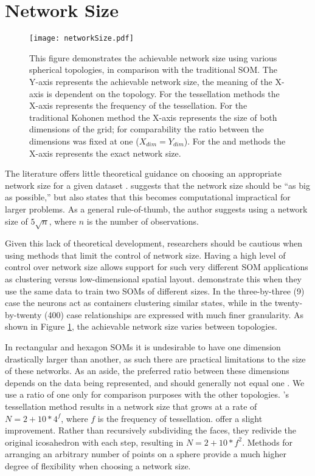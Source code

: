 \section{Network Size}
\begin{figure}[htb]
\centering
\texttt{[image: networkSize.pdf]}
\caption{This figure demonstrates the achievable network size using various
spherical topologies, in comparison with the traditional SOM. The Y-axis represents the achievable network size, the
meaning of the X-axis is dependent on the topology. For the tessellation
methods the X-axis represents the frequency of the tessellation. For the
traditional Kohonen method the X-axis represents the size of both dimensions of
the grid; for comparability the ratio between the dimensions was fixed at one
($X_{dim}=Y_{dim}$).  For the \cite{Rakhmanov94} and \cite{Nishio:2006fk} methods the X-axis
represents the exact network size.}
\label{fig:nSize}
\end{figure}
The literature offers little theoretical guidance on choosing an appropriate
network size for a given dataset \citep{cho1996}.  \cite{toolbox} suggests
that the network size should be ``as big as possible,'' but also states that
this becomes computational impractical for larger problems. As a general
rule-of-thumb, the author suggests using a network size of \(5\sqrt {n}\),
where \(n\) is the number of observations. 

Given this lack of theoretical
development, researchers should be cautious when using methods that limit the
control of network size.  Having a high level of control over network size
allows support for such very different SOM applications as clustering versus
low-dimensional spatial layout.  \cite{skupin08} demonstrate this when they
use the same data to train two SOMs of different sizes.  In the three-by-three
(9) case the neurons act as containers clustering similar states, while in the
twenty-by-twenty (400) case relationships are expressed with much finer
granularity.  As shown in Figure \ref{fig:nSize}, the achievable network size
varies between topologies.

In rectangular and hexagon SOMs it is undesirable to have one
dimension drastically larger than another, as such there are practical
limitations to the size of these networks.  As an aside, the preferred ratio
between these dimensions depends on the data being represented, and should
generally not equal one \citep{kohonen1996, toolbox}. We use a ratio of one
only for comparison purposes with the other topologies.
\citeauthor{ritter99}'s tessellation method results in a network size that
grows at a rate of \(N=2+10*4^f\), where $f$ is the frequency of tessellation.
\cite{wu2006} offer a slight improvement. Rather than recursively subdividing
the faces, they redivide the original icosahedron with each step, resulting in
\(N=2+10*f^2\).  Methods for arranging an arbitrary number of points on a
sphere provide a much higher degree of flexibility when choosing a network
size.


